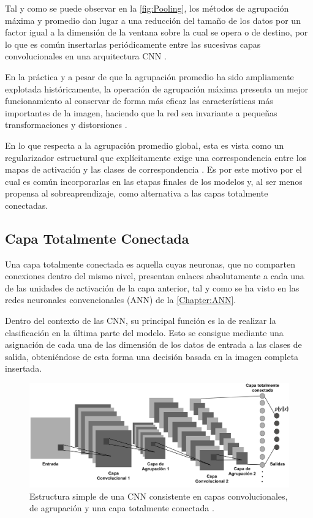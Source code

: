 Tal y como se puede observar en la \autoref{fig:Pooling}, los métodos de agrupación máxima y promedio dan lugar a una reducción del tamaño de los datos por un factor igual a la dimensión de la ventana sobre la cual se opera o de destino, por lo que es común insertarlas periódicamente entre las sucesivas capas convolucionales en una arquitectura CNN \cite{CS231n}.

En la práctica y a pesar de que la agrupación promedio ha sido ampliamente explotada históricamente, la operación de agrupación máxima presenta un mejor funcionamiento al conservar de forma más eficaz las características más importantes de la imagen, haciendo que la red sea invariante a pequeñas transformaciones y distorsiones \cite{Pooling}.

En lo que respecta a la agrupación promedio global, esta es vista como un regularizador estructural que explícitamente exige una correspondencia entre los mapas de activación y las clases de correspondencia \cite{NetworkInNetwork}. Es por este motivo por el cual es común incorporarlas en las etapas finales de los modelos y, al ser menos propensa al sobreaprendizaje, como alternativa a las capas totalmente conectadas.

\subsection{Capa Totalmente Conectada}

Una capa totalmente conectada es aquella cuyas neuronas, que no comparten conexiones dentro del mismo nivel, presentan enlaces absolutamente a cada una de las unidades de activación de la capa anterior, tal y como se ha visto en las redes neuronales convencionales (ANN) de la \autoref{Chapter:ANN}.

Dentro del contexto de las CNN, su principal función es la de realizar la clasificación en la última parte del modelo. Esto se consigue mediante una asignación de cada una de las dimensión de los datos de entrada a las clases de salida, obteniéndose de esta forma una decisión basada en la imagen completa insertada.

\begin{figure}
    \centering
    \includegraphics[width=\textwidth]{Images/CNN_architecture.png}
    \caption{Estructura simple de una CNN consistente en capas convolucionales, de agrupación y una capa totalmente conectada \cite{ArchitectureCNN}.}
    \label{fig:CNN_arch}
\end{figure}


